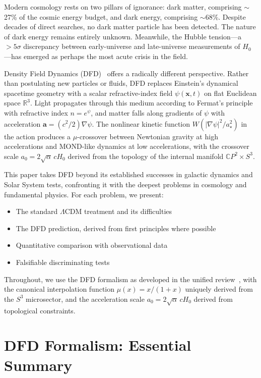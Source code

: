 \documentclass[aps,prd,twocolumn,superscriptaddress,nofootinbib]{revtex4-2}
\newcommand{\avec}{\bm{a}}
\begin{document}
Modern cosmology rests on two pillars of ignorance: dark matter, comprising
$\sim$27\% of the cosmic energy budget, and dark energy, comprising
$\sim$68\%. Despite decades of direct searches, no dark matter particle has
been detected. The nature of dark energy remains entirely unknown. Meanwhile,
the Hubble tension---a $>5\sigma$ discrepancy between early-universe and
late-universe measurements of $H_0$---has emerged as perhaps the most
acute crisis in the field.

Density Field Dynamics (DFD)~\cite{Alcock2024} offers a radically different
perspective. Rather than postulating new particles or fluids, DFD replaces
Einstein's dynamical spacetime geometry with a scalar refractive-index field
$\psi(\mathbf{x},t)$ on flat Euclidean space $\mathbb{R}^3$. Light
propagates through this medium according to Fermat's principle with
refractive index $n = e^\psi$, and matter falls along gradients of $\psi$
with acceleration $\avec = (c^2/2)\nabla\psi$. The nonlinear kinetic
function $W(|\nabla\psi|^2/a_\star^2)$ in the action produces a
$\mu$-crossover between Newtonian gravity at high accelerations and
MOND-like dynamics at low accelerations, with the crossover scale
$a_0 = 2\sqrt{\alpha}\,cH_0$ derived from the topology of the internal
manifold $\mathbb{C}P^2 \times S^3$.

This paper takes DFD beyond its established successes in galactic dynamics
and Solar System tests, confronting it with the deepest problems in
cosmology and fundamental physics. For each problem, we present:
\begin{itemize}[nosep]
\item The standard $\Lambda$CDM treatment and its difficulties
\item The DFD prediction, derived from first principles where possible
\item Quantitative comparison with observational data
\item Falsifiable discriminating tests
\end{itemize}

Throughout, we use the DFD formalism as developed in the unified
review~\cite{Alcock2024}, with the canonical interpolation function
$\mu(x) = x/(1+x)$ uniquely derived from the $S^3$ microsector, and
the acceleration scale $a_0 = 2\sqrt{\alpha}\,cH_0$ derived from
topological constraints.

\section{DFD Formalism: Essential Summary}\label{sec:formalism-summary}
\end{document}
